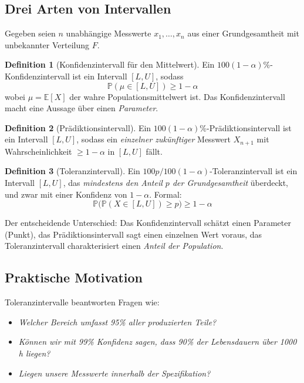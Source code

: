 \documentclass[10pt,a4paper,twocolumn]{article}
\theoremstyle{definition}
\newtheorem{definition}{Definition}[section]
\newcommand{\TI}{Toleranzintervall}
\newcommand{\KI}{Konfidenzintervall}
\newcommand{\E}{\mathbb{E}}
\newcommand{\Prob}{\mathbb{P}}
\begin{document}
\subsection{Drei Arten von Intervallen}

Gegeben seien $n$ unabhängige Messwerte $x_1, \ldots, x_n$ aus einer
Grundgesamtheit mit unbekannter Verteilung $F$.

\begin{definition}[\KI{} für den Mittelwert]
Ein $100(1-\alpha)\%$-\KI{} ist ein Intervall $[L, U]$, sodass
\begin{equation}
    \Prob(\mu \in [L, U]) \geq 1 - \alpha
\end{equation}
wobei $\mu = \E[X]$ der wahre Populationsmittelwert ist.
Das \KI{} macht eine Aussage über einen \emph{Parameter}.
\end{definition}

\begin{definition}[Prädiktionsintervall]
Ein $100(1-\alpha)\%$-Prädiktionsintervall ist ein Intervall $[L, U]$,
sodass ein \emph{einzelner zukünftiger} Messwert $X_{n+1}$ mit
Wahrscheinlichkeit $\geq 1-\alpha$ in $[L, U]$ fällt.
\end{definition}

\begin{definition}[\TI{}]
\label{def:ti}
Ein $100p / 100(1-\alpha)$-\TI{} ist ein Intervall $[L, U]$,
das \emph{mindestens den Anteil $p$ der Grundgesamtheit} überdeckt,
und zwar mit einer Konfidenz von $1 - \alpha$. Formal:
\begin{equation}
    \Prob\!\Big(\Prob(X \in [L, U]) \geq p\Big) \geq 1 - \alpha
    \label{eq:ti_def}
\end{equation}
\end{definition}

Der entscheidende Unterschied: Das \KI{} schätzt einen Parameter
(Punkt), das Prädiktionsintervall sagt einen einzelnen Wert voraus,
das \TI{} charakterisiert einen \emph{Anteil der Population}.

\subsection{Praktische Motivation}

Toleranzintervalle beantworten Fragen wie:

\begin{itemize}[nosep,leftmargin=*]
    \item \emph{Welcher Bereich umfasst 95\% aller produzierten Teile?}
    \item \emph{Können wir mit 99\% Konfidenz sagen, dass 90\% der
          Lebensdauern über 1000\,h liegen?}
    \item \emph{Liegen unsere Messwerte innerhalb der Spezifikation?}
\end{itemize}
\end{document}
